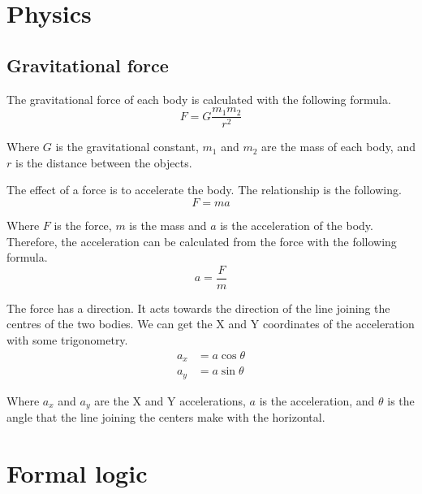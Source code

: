 \documentclass{article}
\begin{document}
\section{Physics}

\subsection{Gravitational force}

The gravitational force of each body is calculated with the following formula.
\begin{equation*}
  F = G \frac{m_1m_2}{r^2}
\end{equation*}

Where $G$ is the gravitational constant, $m_1$ and $m_2$ are the mass of
each body, and $r$ is the distance between the objects.

The effect of a force is to accelerate the body. The relationship is the
following.
\begin{equation*}
  F = m a
\end{equation*}

Where $F$ is the force, $m$ is the mass and $a$ is the acceleration of
the body. Therefore, the acceleration can be calculated from the force with the
following formula.
\begin{equation*}
  a = \frac{F}{m}
\end{equation*}

The force has a direction. It acts towards the direction of the line joining
the centres of the two bodies. We can get the X and Y coordinates of the
acceleration with some trigonometry.
\begin{align*}
  a_x &= a \cos \theta \\
  a_y &= a \sin \theta
\end{align*}

Where $a_x$ and $a_y$ are the X and Y accelerations, $a$ is the
acceleration, and $\theta$ is the angle that the line joining the centers make
with the horizontal.

\section{Formal logic}
\end{document}
